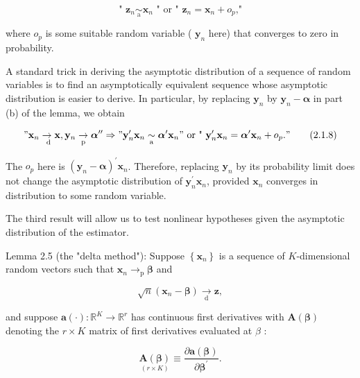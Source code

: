 \documentclass[10pt]{article}
\begin{document}
$$
\text { " } \mathbf{z}_{n} \underset{\mathrm{a}}{\sim} \mathbf{x}_{n} \text { " or " } \mathbf{z}_{n}=\mathbf{x}_{n}+o_{p} \text {," }
$$

where $o_{p}$ is some suitable random variable ( $\mathbf{y}_{n}$ here) that converges to zero in probability.

A standard trick in deriving the asymptotic distribution of a sequence of random variables is to find an asymptotically equivalent sequence whose asymptotic distribution is easier to derive. In particular, by replacing $\mathbf{y}_{n}$ by $\mathbf{y}_{n}-\boldsymbol{\alpha}$ in part (b) of the lemma, we obtain


\begin{equation*}
" \mathbf{x}_{n} \underset{\mathrm{~d}}{\rightarrow} \mathbf{x}, \mathbf{y}_{n} \underset{\mathrm{p}}{\rightarrow} \boldsymbol{\alpha}^{\prime \prime} \Rightarrow " \mathbf{y}_{n}^{\prime} \mathbf{x}_{n} \underset{\mathrm{a}}{\sim} \boldsymbol{\alpha}^{\prime} \mathbf{x}_{n} " \text { or " } \mathbf{y}_{n}^{\prime} \mathbf{x}_{n}=\boldsymbol{\alpha}^{\prime} \mathbf{x}_{n}+o_{p} . " \tag{2.1.8}
\end{equation*}


The $o_{p}$ here is $\left(\mathbf{y}_{n}-\boldsymbol{\alpha}\right)^{\prime} \mathbf{x}_{n}$. Therefore, replacing $\mathbf{y}_{n}$ by its probability limit does not change the asymptotic distribution of $\mathbf{y}_{n}^{\prime} \mathbf{x}_{n}$, provided $\mathbf{x}_{n}$ converges in distribution to some random variable.

The third result will allow us to test nonlinear hypotheses given the asymptotic distribution of the estimator.

Lemma 2.5 (the "delta method"): Suppose $\left\{\mathbf{x}_{n}\right\}$ is a sequence of $K$-dimensional random vectors such that $\mathbf{x}_{n} \rightarrow_{\mathrm{p}} \boldsymbol{\beta}$ and

$$
\sqrt{n}\left(\mathbf{x}_{n}-\boldsymbol{\beta}\right) \underset{\mathrm{d}}{\rightarrow} \mathbf{z},
$$

and suppose $\mathbf{a}(\cdot): \mathbb{R}^{K} \rightarrow \mathbb{R}^{r}$ has continuous first derivatives with $\mathbf{A}(\boldsymbol{\beta})$ denoting the $r \times K$ matrix of first derivatives evaluated at $\beta$ :

$$
\underset{(r \times K)}{\mathbf{A}(\boldsymbol{\beta})} \equiv \frac{\partial \mathbf{a}(\boldsymbol{\beta})}{\partial \boldsymbol{\beta}^{\prime}} .
$$
\end{document}
